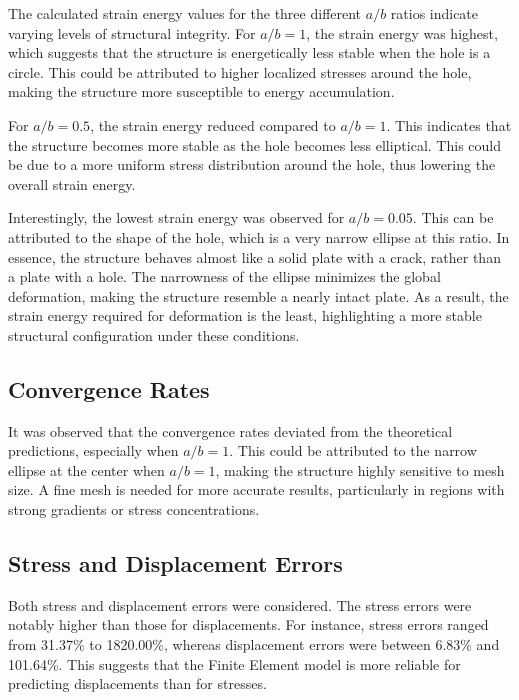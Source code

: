 \documentclass[twoside,twocolumn,10pt]{article}
\begin{document}
The calculated strain energy values for the three different \( a/b \) ratios indicate varying levels of structural integrity. For \( a/b = 1 \), the strain energy was highest, which suggests that the structure is energetically less stable when the hole is a circle. This could be attributed to higher localized stresses around the hole, making the structure more susceptible to energy accumulation.

For \( a/b = 0.5 \), the strain energy reduced compared to \( a/b = 1 \). This indicates that the structure becomes more stable as the hole becomes less elliptical. This could be due to a more uniform stress distribution around the hole, thus lowering the overall strain energy.

Interestingly, the lowest strain energy was observed for \( a/b = 0.05 \). This can be attributed to the shape of the hole, which is a very narrow ellipse at this ratio. In essence, the structure behaves almost like a solid plate with a crack, rather than a plate with a hole. The narrowness of the ellipse minimizes the global deformation, making the structure resemble a nearly intact plate. As a result, the strain energy required for deformation is the least, highlighting a more stable structural configuration under these conditions.

\subsection*{Convergence Rates}

It was observed that the convergence rates deviated from the theoretical predictions, especially when \( a/b = 1 \). This could be attributed to the narrow ellipse at the center when \( a/b = 1 \), making the structure highly sensitive to mesh size. A fine mesh is needed for more accurate results, particularly in regions with strong gradients or stress concentrations.

\subsection*{Stress and Displacement Errors}

Both stress and displacement errors were considered. The stress errors were notably higher than those for displacements. For instance, stress errors ranged from 31.37\% to 1820.00\%, whereas displacement errors were between 6.83\% and 101.64\%. This suggests that the Finite Element model is more reliable for predicting displacements than for stresses.
\end{document}
